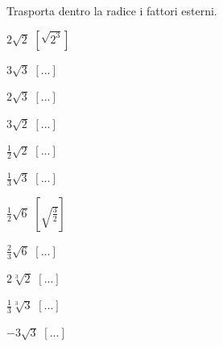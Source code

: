 \subsubsection*{}

\begin{esercizio}[\Ast]
 \label{ese:2.40}
Trasporta dentro la radice i fattori esterni.
 \begin{multicols}{4}
 \begin{enumeratea}
 \item $2\sqrt 2$
  \hfill $\left[\sqrt{2^3}\right]$
 \item $3\sqrt 3$
  \hfill $\left[...\right]$
 \item $2\sqrt 3$
  \hfill $\left[...\right]$
 \item $3\sqrt 2$
  \hfill $\left[...\right]$
 \item $\frac 1 2\sqrt 2$
  \hfill $\left[...\right]$
 \item $\frac 1 3\sqrt 3$
  \hfill $\left[...\right]$
 \item $\frac 1 2\sqrt 6$
  \hfill $\left[\sqrt{\frac 3 2}\right]$
 \item $\frac 2 3\sqrt 6$
  \hfill $\left[...\right]$
 \item $2\sqrt[3]2$
  \hfill $\left[...\right]$
 \item $\frac 1 3\sqrt[3]3$
  \hfill $\left[...\right]$
 \item $-3\sqrt 3$
  \hfill $\left[...\right]$
 \end{enumeratea}
 \end{multicols}
\end{esercizio}

